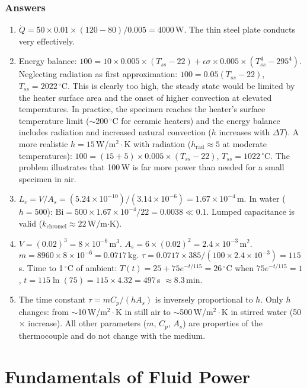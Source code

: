 \documentclass[11pt,letterpaper,twoside,openany]{book}
\newcommand{\degC}{\ensuremath{{}^{\circ}\text{C}}}
\begin{document}
\subsection{Answers}
\begin{enumerate}[leftmargin=1.5em]
\item $\dot{Q} = 50 \times 0.01 \times (120-80)/0.005 = 4000$\,W. The thin steel plate conducts very effectively.
\item Energy balance: $100 = 10 \times 0.005 \times (T_{ss} - 22) + \epsilon\sigma \times 0.005 \times (T_{ss}^4 - 295^4)$. Neglecting radiation as first approximation: $100 = 0.05(T_{ss} - 22)$, $T_{ss} = 2022$\,\degC{}. This is clearly too high, the steady state would be limited by the heater surface area and the onset of higher convection at elevated temperatures. In practice, the specimen reaches the heater's surface temperature limit ($\sim$200\,\degC{} for ceramic heaters) and the energy balance includes radiation and increased natural convection ($h$ increases with $\Delta T$). A more realistic $h = 15$\,W/m$^2\cdot$K with radiation ($h_{\text{rad}} \approx 5$ at moderate temperatures): $100 = (15+5) \times 0.005 \times (T_{ss} - 22)$, $T_{ss} = 1022$\,\degC{}. The problem illustrates that 100\,W is far more power than needed for a small specimen in air.
\item $L_c = V/A_s = (5.24 \times 10^{-10})/(3.14 \times 10^{-6}) = 1.67 \times 10^{-4}$\,m. In water ($h = 500$): $\text{Bi} = 500 \times 1.67 \times 10^{-4}/22 = 0.0038 \ll 0.1$. Lumped capacitance is valid ($k_{\text{chromel}} \approx 22$\,W/m$\cdot$K).
\item $V = (0.02)^3 = 8 \times 10^{-6}$\,m$^3$. $A_s = 6 \times (0.02)^2 = 2.4 \times 10^{-3}$\,m$^2$. $m = 8960 \times 8 \times 10^{-6} = 0.0717$\,kg. $\tau = 0.0717 \times 385/(100 \times 2.4 \times 10^{-3}) = 115$\,s. Time to 1\,\degC{} of ambient: $T(t) = 25 + 75e^{-t/115} = 26$\,\degC{} when $75e^{-t/115} = 1$, $t = 115\ln(75) = 115 \times 4.32 = 497$\,s $\approx 8.3$\,min.
\item The time constant $\tau = mC_p/(hA_s)$ is inversely proportional to $h$. Only $h$ changes: from $\sim$10\,W/m$^2\cdot$K in still air to $\sim$500\,W/m$^2\cdot$K in stirred water (50$\times$ increase). All other parameters ($m$, $C_p$, $A_s$) are properties of the thermocouple and do not change with the medium.
\end{enumerate}


\chapter{Fundamentals of Fluid Power}
\label{ch:fluid}
\end{document}
